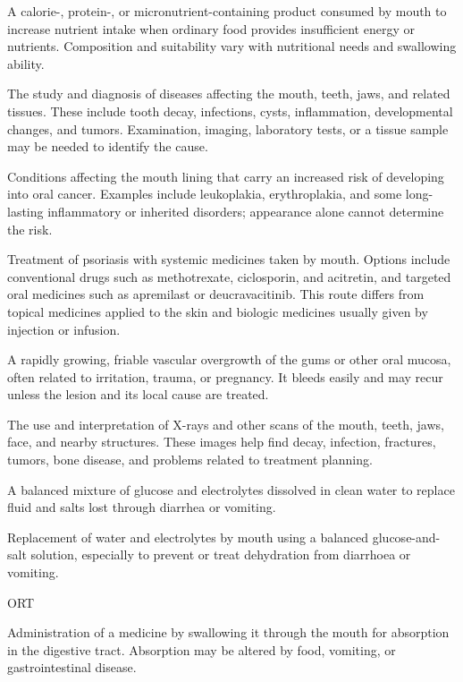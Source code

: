  A calorie-, protein-, or micronutrient-containing product consumed by mouth to
increase nutrient intake when ordinary food provides insufficient energy or nutrients.
Composition and suitability vary with nutritional needs and swallowing ability.

 The study and diagnosis of diseases affecting the mouth, teeth, jaws, and related tissues. These include tooth decay, infections, cysts, inflammation, developmental changes, and tumors. Examination, imaging, laboratory tests, or a tissue sample may be needed to identify the cause.

 Conditions affecting the mouth lining that carry an increased risk of developing into oral cancer. Examples include leukoplakia, erythroplakia, and some long-lasting inflammatory or inherited disorders; appearance alone cannot determine the risk.

 Treatment of psoriasis with systemic medicines taken by mouth. Options include conventional drugs such as methotrexate, ciclosporin, and acitretin, and targeted oral medicines such as apremilast or deucravacitinib. This route differs from topical medicines applied to the skin and biologic medicines usually given by injection or infusion.

 A rapidly growing, friable vascular overgrowth of the gums or other oral mucosa, often related to irritation, trauma, or pregnancy. It bleeds easily and may recur unless the lesion and its local cause are treated.

 The use and interpretation of X-rays and other scans of the mouth, teeth, jaws, face, and nearby structures. These images help find decay, infection, fractures, tumors, bone disease, and problems related to treatment planning.

 A balanced mixture of glucose and electrolytes dissolved in clean water to replace fluid and salts lost through diarrhea or vomiting.

 Replacement of water and electrolytes by mouth using a balanced glucose-and-salt solution, especially to prevent or treat dehydration from diarrhoea or vomiting.

\synonyms
ORT

 Administration of a medicine by swallowing it through the mouth for absorption in the digestive tract. Absorption may be altered by food, vomiting, or gastrointestinal disease.


